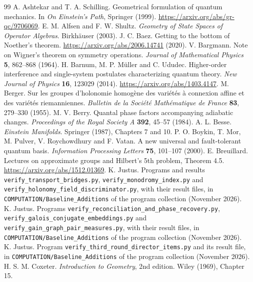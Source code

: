\documentclass[11pt,a4paper]{article}
\begin{document}
\begin{thebibliography}{99}
 A. Ashtekar and T. A. Schilling. Geometrical formulation of quantum mechanics. In \emph{On Einstein's Path}, Springer (1999). \url{https://arxiv.org/abs/gr-qc/9706069}.
 E. M. Alfsen and F. W. Shultz. \emph{Geometry of State Spaces of Operator Algebras}. Birkh\"auser (2003).
 J. C. Baez. Getting to the bottom of Noether's theorem. \url{https://arxiv.org/abs/2006.14741} (2020).
 V. Bargmann. Note on Wigner's theorem on symmetry operations. \emph{Journal of Mathematical Physics} \textbf{5}, 862--868 (1964).
 H. Barnum, M. P. M\"uller and C. Ududec. Higher-order interference and single-system postulates characterizing quantum theory. \emph{New Journal of Physics} \textbf{16}, 123029 (2014). \url{https://arxiv.org/abs/1403.4147}.
 M. Berger. Sur les groupes d'holonomie homog\`ene des vari\'et\'es \`a connexion affine et des vari\'et\'es riemanniennes. \emph{Bulletin de la Soci\'et\'e Math\'ematique de France} \textbf{83}, 279--330 (1955).
 M. V. Berry. Quantal phase factors accompanying adiabatic changes. \emph{Proceedings of the Royal Society A} \textbf{392}, 45--57 (1984).
 A. L. Besse. \emph{Einstein Manifolds}. Springer (1987), Chapters 7 and 10.
 P. O. Boykin, T. Mor, M. Pulver, V. Roychowdhury and F. Vatan. A new universal and fault-tolerant quantum basis. \emph{Information Processing Letters} \textbf{75}, 101--107 (2000).
 E. Breuillard. Lectures on approximate groups and Hilbert's 5th problem, Theorem 4.5. \url{https://arxiv.org/abs/1512.01369}.
 K. Justus. Programs and results \texttt{verify\_transport\_bridges.py}, \texttt{verify\_monodromy\_index.py} and \texttt{verify\_holonomy\_field\_discriminator.py}, with their result files, in \texttt{COMPUTATION/Baseline\_Additions} of the program collection (November 2026).
 K. Justus. Programs \texttt{verify\_reconciliation\_and\_phase\_recovery.py}, \texttt{verify\_galois\_conjugate\_embeddings.py} and \texttt{verify\_gain\_graph\_pair\_measures.py}, with their result files, in \texttt{COMPUTATION/Baseline\_Additions} of the program collection (November 2026).
 K. Justus. Program \texttt{verify\_third\_round\_director\_items.py} and its result file, in \texttt{COMPUTATION/Baseline\_Additions} of the program collection (November 2026).
 H. S. M. Coxeter. \emph{Introduction to Geometry}, 2nd edition. Wiley (1969), Chapter 15.

\end{thebibliography}
\end{document}
